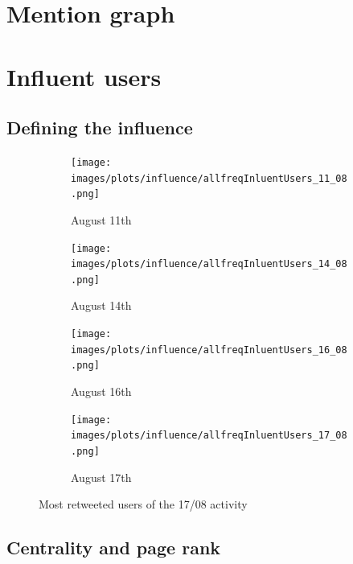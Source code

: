 \documentclass[a4paper,twoside,12pt,openright]{report}
\begin{document}
\newpage

\section{Mention graph}

\newpage
\section{Influent users}
\subsection{Defining the influence}

\begin{figure}[H]
\begin{subfigure}[t]{0.5\textwidth}
\begin{center}
	\texttt{[image: images/plots/influence/allfreqInluentUsers\_11\_08.png]}
	\caption{August 11th}
\end{center}
\end{subfigure}
\hfill
\begin{subfigure}[t]{0.5\textwidth}
\begin{center}
	\texttt{[image: images/plots/influence/allfreqInluentUsers\_14\_08.png]}
	\caption{August 14th}
\end{center}
\end{subfigure}

\begin{subfigure}[t]{0.5\textwidth}
\begin{center}
	\texttt{[image: images/plots/influence/allfreqInluentUsers\_16\_08.png]}
	\caption{August 16th}
\end{center}
\end{subfigure}
\hfill
\begin{subfigure}[t]{0.5\textwidth}
\begin{center}
	\texttt{[image: images/plots/influence/allfreqInluentUsers\_17\_08.png]}
	\caption{August 17th}
\end{center}
\end{subfigure}
\caption{Most retweeted users of the 17/08 activity}
\label{activitiesPlots}
\end{figure}


\subsection{Centrality and page rank}

\newpage
\end{document}
